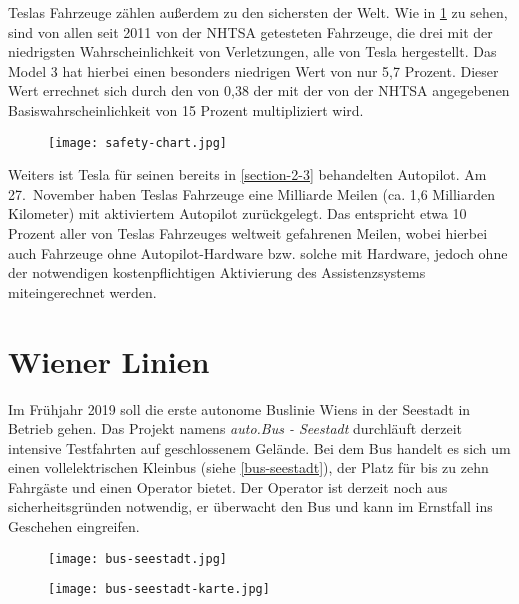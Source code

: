 Teslas Fahrzeuge zählen außerdem zu den sichersten der Welt. Wie in \ref{safety-chart} zu sehen, sind von allen seit 2011 von der \ac{NHTSA} getesteten Fahrzeuge, die drei mit der niedrigsten Wahrscheinlichkeit von Verletzungen, alle von Tesla hergestellt. Das Model 3 hat hierbei einen besonders niedrigen Wert von nur 5,7 Prozent. Dieser Wert errechnet sich durch den  von 0,38 der mit der von der \ac{NHTSA} angegebenen Basiswahrscheinlichkeit von 15 Prozent multipliziert wird. 

\begin{figure}\centering
  \texttt{[image: safety-chart.jpg]}
  \label{safety-chart}
\end{figure}

Weiters ist Tesla für seinen bereits in \ref{section-2-3} behandelten Autopilot. Am 27.\ November haben Teslas Fahrzeuge eine Milliarde Meilen (ca. 1,6 Milliarden Kilometer) mit aktiviertem Autopilot zurückgelegt. Das entspricht etwa 10 Prozent aller von Teslas Fahrzeuges weltweit gefahrenen Meilen, wobei hierbei auch Fahrzeuge ohne Autopilot-Hardware bzw. solche mit Hardware, jedoch ohne der notwendigen kostenpflichtigen Aktivierung des Assistenzsystems miteingerechnet werden. 


\section{Wiener Linien}

Im Frühjahr 2019 soll die erste autonome Buslinie Wiens in der Seestadt in Betrieb gehen. Das Projekt namens \emph{auto.Bus - Seestadt} durchläuft derzeit intensive Testfahrten auf geschlossenem Gelände. Bei dem Bus handelt es sich um einen vollelektrischen Kleinbus (siehe \ref{bus-seestadt}), der Platz für bis zu zehn Fahrgäste und einen Operator bietet. Der Operator ist derzeit noch aus sicherheitsgründen notwendig, er überwacht den Bus und kann im Ernstfall ins Geschehen eingreifen. 

\begin{figure}\centering
  \texttt{[image: bus-seestadt.jpg]}
  \label{bus-seestadt}

  \texttt{[image: bus-seestadt-karte.jpg]}
  \label{bus-seestadt-karte}
\end{figure}

